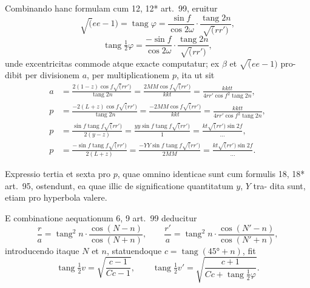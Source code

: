 \documentclass[12pt,a4paper]{article}
\newcommand{\tang}{\mathop{\mathrm{tang}}\nolimits}
\begin{document}
Combinando hanc formulam cum 12, 12* art.~99, eruitur
\begin{equation}\tag{19}
\surd(ee - 1) = \tang\varphi = \frac{\sin f}{\cos 2\omega}\cdot\frac{\tang 2n}{\surd(rr')},
\end{equation}
\begin{equation}\tag{19*}
\tang\tfrac{1}{2}\varphi = \frac{-\sin f}{\cos 2\omega}\cdot\frac{\tang 2n}{\surd(rr')},
\end{equation}
unde excentricitas commode atque exacte computatur; ex $\beta$ et $\surd(ee - 1)$ pro-
dibit per divisionem $a$, per multiplicationem $p$, ita ut sit
\begin{align*}
a &= \frac{2(1 - z)\cos f\surd(rr')}{\tang 2n} = \frac{2MM\cos f\surd(rr')}{kkt} = \frac{kktt}{4rr'\cos f^2\tang 2n}, \\
p &= \frac{-2(L + z)\cos f\surd(rr')}{\tang 2n} = \frac{-2MM\cos f\surd(rr')}{kkt} = \frac{kktt}{4rr'\cos f^2\tang 2n}, \\
p &= \frac{\sin f\tang f\surd(rr')}{2(y - z)} = \frac{yy\sin f\tang f\surd(rr')}{1} = \frac{kt\surd(rr')\sin 2f}{\dots}, \\
p &= \frac{-\sin f\tang f\surd(rr')}{2(L + z)} = \frac{-YY\sin f\tang f\surd(rr')}{2MM} = \frac{kt\surd(rr')\sin 2f}{\dots}.
\end{align*}

Expressio tertia et sexta pro $p$, quae omnino identicae sunt cum formulis 18,
18* art.~95, ostendunt, ea quae illic de significatione quantitatum $y$, $Y$ tra-
dita sunt, etiam pro hyperbola valere.

E combinatione aequationum 6, 9 art.~99 deducitur
\begin{equation}
\frac{r}{a} = \tang^2 n\cdot\frac{\cos(N - n)}{\cos(N + n)}, \qquad
\frac{r'}{a} = \tang^2 n\cdot\frac{\cos(N' - n)}{\cos(N' + n)},
\end{equation}
introducendo itaque $N$ et $n$, statuendoque $c = \tang(45° + n)$, fit
\[
\tang\tfrac{1}{2}v = \sqrt{\frac{c - 1}{Cc - 1}}, \qquad
\tang\tfrac{1}{2}v' = \sqrt{\frac{c + 1}{Cc + \tang\frac{1}{2}\varphi}}.
\]
\end{document}
